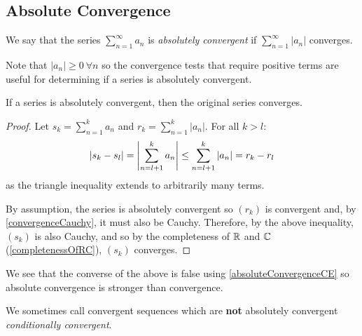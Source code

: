 \documentclass[../main.tex]{subfiles}
\begin{document}
\subsection{Absolute Convergence}
\begin{definition}
  We say that the series $\sum_{n = 1}^{\infty} a_n$ is \textit{absolutely convergent} if $\sum_{n = 1}^{\infty} |a_n|$ converges.
\end{definition}
\begin{remark}
  Note that $|a_n| \geq 0\ \forall n$ so the convergence tests that require positive terms are useful for determining if a series is absolutely convergent.
\end{remark}
\begin{lemma}
  If a series is absolutely convergent, then the original series converges.
  \label{absoluteImpliesConvergence}
\end{lemma}
\begin{proof}
  Let $s_k = \sum_{n = 1}^{k} a_n$ and $r_k = \sum_{n = 1}^{k} |a_n|$.
  For all $k > l$:
  \begin{align*}
    |s_k - s_l| = \left\lvert \sum_{n = l + 1}^{k} a_n \right\rvert \leq \sum_{n = l + 1}^{k} |a_n| = r_k - r_l
  \end{align*}
  as the triangle inequality extends to arbitrarily many terms.

  By assumption, the series is absolutely convergent so $(r_k)$ is convergent and, by \cref{convergenceCauchy}, it must also be Cauchy.
  Therefore, by the above inequality, $(s_k)$ is also Cauchy, and so by the completeness of $\mathbb{R}$ and $\mathbb{C}$ (\cref{completenessOfRC}), $(s_k)$ converges.
\end{proof}
\begin{remark}
  We see that the converse of the above is false using \cref{absoluteConvergenceCE} so absolute convergence is stronger than convergence.

  We sometimes call convergent sequences which are \textbf{not} absolutely convergent \textit{conditionally convergent}.
\end{remark}
\end{document}
